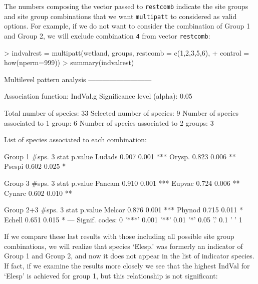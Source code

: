 \documentclass[11pt,a4paper]{article}
\begin{document}
The numbers composing the vector passed to \texttt{restcomb} indicate the site groups and site group combinations that we want \texttt{multipatt} to considered as valid options. For example, if we do not want to consider the combination of Group 1 and Group 2, we will exclude combination \texttt{4} from vector \texttt{restcomb}:
\begin{Schunk}
\begin{Sinput}
> indvalrest = multipatt(wetland, groups, restcomb = c(1,2,3,5,6), 
+                        control = how(nperm=999)) 
> summary(indvalrest)
\end{Sinput}
\begin{Soutput}
 Multilevel pattern analysis
 ---------------------------

 Association function: IndVal.g
 Significance level (alpha): 0.05

 Total number of species: 33
 Selected number of species: 9 
 Number of species associated to 1 group: 6 
 Number of species associated to 2 groups: 3 

 List of species associated to each combination: 

 Group 1  #sps.  3 
        stat p.value    
Ludads 0.907   0.001 ***
Orysp. 0.823   0.006 ** 
Psespi 0.602   0.025 *  

 Group 3  #sps.  3 
        stat p.value    
Pancam 0.910   0.001 ***
Eupvac 0.724   0.006 ** 
Cynarc 0.602   0.010 ** 

 Group 2+3  #sps.  3 
        stat p.value    
Melcor 0.876   0.001 ***
Phynod 0.715   0.011 *  
Echell 0.651   0.015 *  
---
Signif. codes:  0 '***' 0.001 '**' 0.01 '*' 0.05 '.' 0.1 ' ' 1 
\end{Soutput}
\end{Schunk}
If we compare these last results with those including all possible site group combinations, we will realize that species `Elesp.' was formerly an indicator of Group 1 and Group 2, and now it does not appear in the list of indicator species. If fact, if we examine the results more closely we see that the highest IndVal for `Elesp' is achieved for group 1, but this relationship is not significant:
\end{document}
